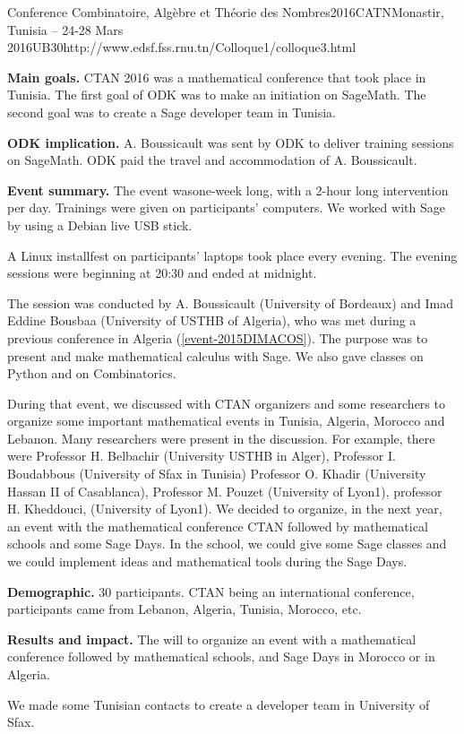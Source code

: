 \begin{event}{Conference Combinatoire, Algèbre et Théorie des Nombres}{2016CATN}{Monastir, Tunisia -- 24-28 Mars 2016}{UB}{30}{http://www.edsf.fss.rnu.tn/Colloque1/colloque3.html}

\textbf{Main goals.}
CTAN 2016 was a mathematical conference that took place in Tunisia.
The first goal of ODK was to make an initiation on SageMath. 
The second goal was to create a Sage developer team in Tunisia.

\textbf{ODK implication.} A. Boussicault was sent by ODK to deliver training sessions on
SageMath. ODK paid the travel and accommodation of A. Boussicault.

\textbf{Event summary.}
The event wasone-week long, with a 2-hour long intervention per day. 
Trainings were given on participants' computers.
We worked with Sage by using a Debian live USB stick.

A Linux installfest on participants' laptops took place every evening. 
The evening sessions were beginning at 20:30 and ended at midnight.

The session was conducted by A. Boussicault (University of Bordeaux) and 
Imad Eddine Bousbaa (University of USTHB of Algeria), who was met during a 
previous conference in Algeria (\ref{event-2015DIMACOS}).
The purpose was to present and make mathematical calculus with Sage.
We also gave classes on Python and on Combinatorics.

During that event, we discussed with CTAN organizers and some researchers 
to organize some important mathematical events in Tunisia, Algeria, Morocco and
Lebanon.
Many researchers were present in the discussion. For example, there were 
Professor H. Belbachir (University USTHB in Alger), 
Professor I. Boudabbous (University of Sfax in Tunisia)
Professor O. Khadir (University Hassan II of Casablanca),
Professor M. Pouzet (University of Lyon1),
professor H. Kheddouci, (University of Lyon1).
We decided to organize, in the next year, an event with the mathematical 
conference CTAN followed by mathematical schools and some Sage Days.
In the school, we could give some Sage classes and we could implement ideas 
and mathematical tools during the Sage Days.

\textbf{Demographic.} 30 participants. CTAN being an international conference, participants
 came from Lebanon, Algeria, Tunisia, Morocco, etc. 

\textbf{Results and impact.}
The will to organize an event with a mathematical conference 
followed by mathematical schools, and Sage Days in Morocco or in Algeria.

We made some Tunisian contacts to create a developer team in University of 
Sfax.

\end{event}
